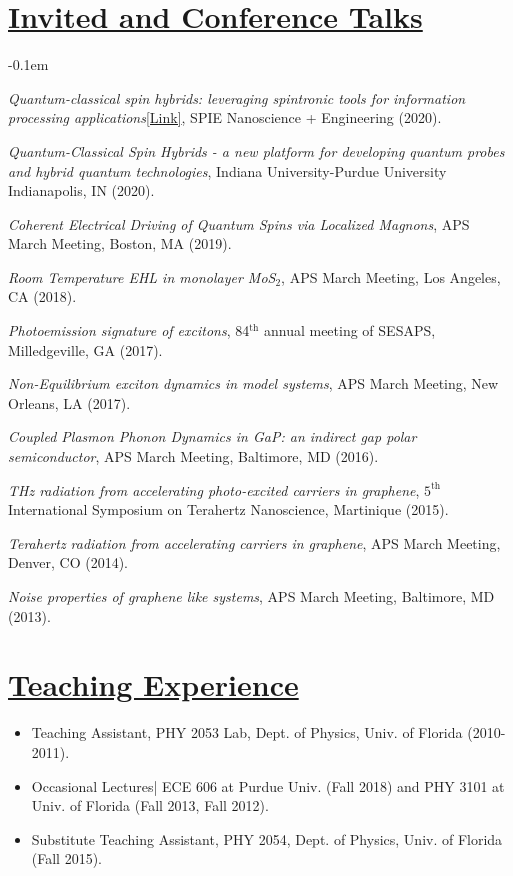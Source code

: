 \documentclass[12pt]{article}
\begin{document}
\section*{\underline{Invited and Conference Talks}}
\begin{etaremune}
\itemsep-0.1em
\item \textit{Quantum-classical spin hybrids: leveraging spintronic tools for information processing applications}\href{https://doi.org/10.1117/12.2567795}{[Link]}, SPIE Nanoscience + Engineering (2020).

\item \textit{Quantum-Classical Spin Hybrids - a new platform for developing quantum probes and hybrid quantum technologies}, Indiana University-Purdue University Indianapolis, IN (2020).

\item \textit{Coherent Electrical Driving of Quantum Spins via Localized Magnons}, APS March Meeting, Boston, MA (2019).

\item \textit{Room Temperature EHL in monolayer MoS$_2$}, APS March Meeting, Los Angeles, CA (2018).

 \item \textit{Photoemission signature of excitons}, 84$^\mathrm{th}$ annual meeting of SESAPS, Milledgeville, GA (2017).

\item \textit{Non-Equilibrium exciton dynamics in model systems}, APS March Meeting, New Orleans, LA (2017).
 
\item \textit{Coupled Plasmon Phonon Dynamics in GaP: an indirect gap polar semiconductor}, APS March Meeting, Baltimore, MD (2016).

 \item \textit{THz radiation from accelerating photo-excited carriers in graphene}, $5^\mathrm{th}$ International Symposium on Terahertz Nanoscience, Martinique (2015).

\item \textit{Terahertz radiation from accelerating carriers in graphene}, APS March Meeting, Denver, CO (2014).

\item \textit{Noise properties of graphene like systems}, APS March Meeting, Baltimore, MD (2013).
 \end{etaremune}

\vspace{-0.1in}
\section*{\underline{Teaching Experience}}
\begin{itemize}
\item Teaching Assistant, PHY 2053 Lab, Dept. of Physics, Univ. of Florida (2010-2011).
\item Occasional Lectures| ECE 606 at Purdue Univ. (Fall 2018) and PHY 3101 at Univ. of Florida (Fall 2013, Fall 2012).
\item Substitute Teaching Assistant, PHY 2054, Dept. of Physics, Univ. of Florida (Fall 2015).
\end{itemize}
\end{document}
